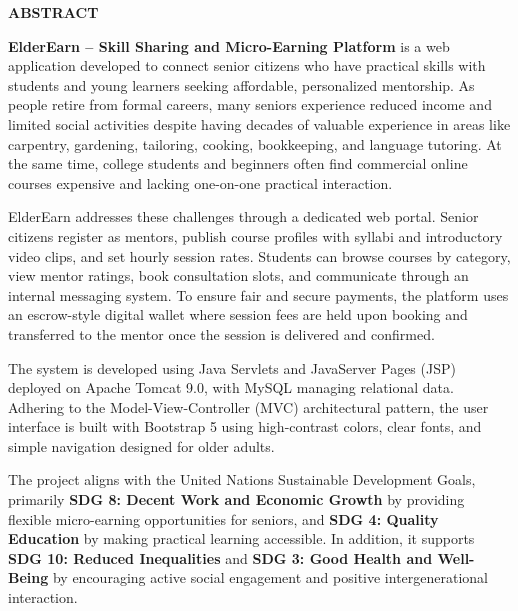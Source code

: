 \documentclass[12pt,a4paper]{report}
\begin{document}
\newpage
\thispagestyle{empty}
\begin{center}
\fontsize{16pt}{18pt}\selectfont
\textbf{ABSTRACT}
\end{center}
\vspace{0.8cm}
\textbf{ElderEarn -- Skill Sharing and Micro-Earning Platform} is a web application developed to connect senior citizens who have practical skills with students and young learners seeking affordable, personalized mentorship. As people retire from formal careers, many seniors experience reduced income and limited social activities despite having decades of valuable experience in areas like carpentry, gardening, tailoring, cooking, bookkeeping, and language tutoring. At the same time, college students and beginners often find commercial online courses expensive and lacking one-on-one practical interaction.

ElderEarn addresses these challenges through a dedicated web portal. Senior citizens register as mentors, publish course profiles with syllabi and introductory video clips, and set hourly session rates. Students can browse courses by category, view mentor ratings, book consultation slots, and communicate through an internal messaging system. To ensure fair and secure payments, the platform uses an escrow-style digital wallet where session fees are held upon booking and transferred to the mentor once the session is delivered and confirmed.

The system is developed using Java Servlets and JavaServer Pages (JSP) deployed on Apache Tomcat 9.0, with MySQL managing relational data. Adhering to the Model-View-Controller (MVC) architectural pattern, the user interface is built with Bootstrap 5 using high-contrast colors, clear fonts, and simple navigation designed for older adults.

The project aligns with the United Nations Sustainable Development Goals, primarily \textbf{SDG 8: Decent Work and Economic Growth} by providing flexible micro-earning opportunities for seniors, and \textbf{SDG 4: Quality Education} by making practical learning accessible. In addition, it supports \textbf{SDG 10: Reduced Inequalities} and \textbf{SDG 3: Good Health and Well-Being} by encouraging active social engagement and positive intergenerational interaction.
\clearpage

\pagestyle{empty}
\tableofcontents
\clearpage
\listoffigures
\clearpage
\listoftables
\clearpage
\end{document}
